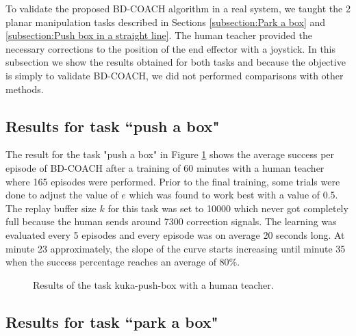 To validate the proposed BD-COACH algorithm in a real system, we taught the 2 planar manipulation tasks described in Sections \ref{subsection:Park a box} and \ref{subsection:Push box in a straight line}. The human teacher provided the necessary corrections to the position of the end effector with a joystick. In this subsection we show the results obtained for both tasks and because the objective is simply to validate BD-COACH, we did not performed comparisons with other methods. 


\subsection{Results for task ``push a box"}
\label{subsection:results_kuka_push}
The result for the task "push a box" in Figure \ref{fig:kukapush} shows the average success per episode of BD-COACH after a training of 60 minutes with a human teacher where 165 episodes were performed. Prior to the final training, some trials were done to adjust the value of $e$ which was found to work best with a value of 0.5. The replay buffer size $k$ for this task was set to 10000 which never got completely full because the human sends around 7300 correction signals.
The learning was evaluated every 5 episodes and every episode was on average 20 seconds long. At minute 23 approximately, the slope of the curve starts increasing until minute 35 when the success percentage reaches an average of 80\%.












 \begin{figure}[H]
  \centering

   \caption{Results of the task kuka-push-box with a human teacher.}
  \label{fig:kukapush}
\end{figure}


\subsection{Results for task ``park a box"}
\label{subsection:results_kuka_park}


